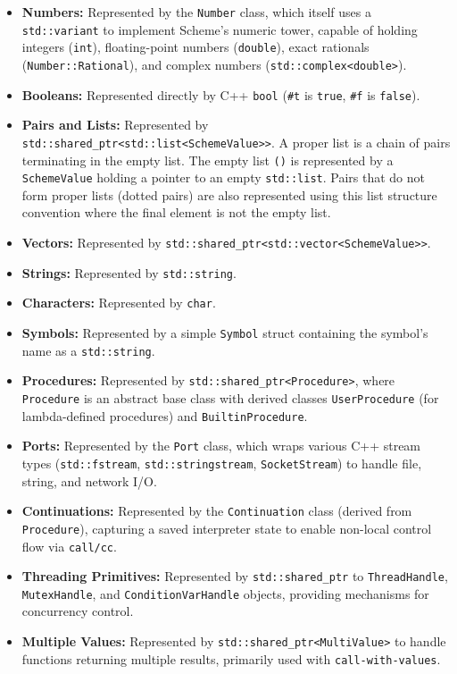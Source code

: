 \documentclass[final]{cmpreport_02}
\begin{document}
\begin{itemize}
    \item \textbf{Numbers:} Represented by the \texttt{Number} class, which itself uses a \texttt{std::variant} to implement Scheme's numeric tower, capable of holding integers (\texttt{int}), floating-point numbers (\texttt{double}), exact rationals (\texttt{Number::Rational}), and complex numbers (\texttt{std::complex<double>}).
    \item \textbf{Booleans:} Represented directly by C++ \texttt{bool} (\texttt{\#t} is \texttt{true}, \texttt{\#f} is \texttt{false}).
    \item \textbf{Pairs and Lists:} Represented by \texttt{std::shared\_ptr<std::list<SchemeValue>>}. A proper list is a chain of pairs terminating in the empty list. The empty list \texttt{()} is represented by a \texttt{SchemeValue} holding a pointer to an empty \texttt{std::list}. Pairs that do not form proper lists (dotted pairs) are also represented using this list structure convention where the final element is not the empty list.
    \item \textbf{Vectors:} Represented by \texttt{std::shared\_ptr<std::vector<SchemeValue>>}.
    \item \textbf{Strings:} Represented by \texttt{std::string}.
    \item \textbf{Characters:} Represented by \texttt{char}.
    \item \textbf{Symbols:} Represented by a simple \texttt{Symbol} struct containing the symbol's name as a \texttt{std::string}.
    \item \textbf{Procedures:} Represented by \texttt{std::shared\_ptr<Procedure>}, where \texttt{Procedure} is an abstract base class with derived classes \texttt{UserProcedure} (for lambda-defined procedures) and \texttt{BuiltinProcedure}.
    \item \textbf{Ports:} Represented by the \texttt{Port} class, which wraps various C++ stream types (\texttt{std::fstream}, \texttt{std::stringstream}, \texttt{SocketStream}) to handle file, string, and network I/O.
    \item \textbf{Continuations:} Represented by the \texttt{Continuation} class (derived from \texttt{Procedure}), capturing a saved interpreter state to enable non-local control flow via \texttt{call/cc}.
    \item \textbf{Threading Primitives:} Represented by \texttt{std::shared\_ptr} to \texttt{ThreadHandle}, \texttt{MutexHandle}, and \texttt{ConditionVarHandle} objects, providing mechanisms for concurrency control.
    \item \textbf{Multiple Values:} Represented by \texttt{std::shared\_ptr<MultiValue>} to handle functions returning multiple results, primarily used with \texttt{call-with-values}.
\end{itemize}
\end{document}
